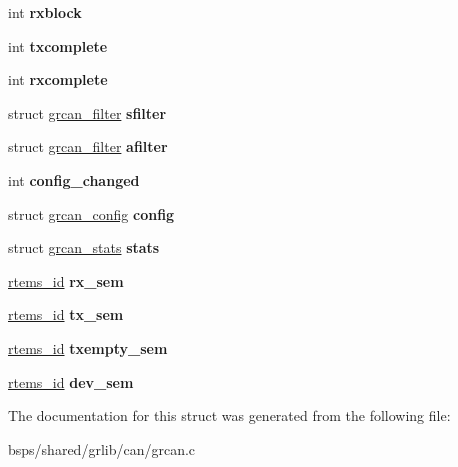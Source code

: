 \begin{DoxyCompactItemize}
int {\bfseries rxblock}
\item 
\mbox{\label{structgrcan__priv_a722037ca064180e5eb7f69c8d8c2ed09}} 
int {\bfseries txcomplete}
\item 
\mbox{\label{structgrcan__priv_a4f6cb3db3c36ff57527d652f97f72e55}} 
int {\bfseries rxcomplete}
\item 
\mbox{\label{structgrcan__priv_ac472233502e56857c0bfd4ef675fe5e2}} 
struct \mbox{\hyperlink{structgrcan__filter}{grcan\+\_\+filter}} {\bfseries sfilter}
\item 
\mbox{\label{structgrcan__priv_a7e9d2e0dddb2977432f7a9a7500bf295}} 
struct \mbox{\hyperlink{structgrcan__filter}{grcan\+\_\+filter}} {\bfseries afilter}
\item 
\mbox{\label{structgrcan__priv_a85a3bfbb21890f7a6ebaee01f8e10a02}} 
int {\bfseries config\+\_\+changed}
\item 
\mbox{\label{structgrcan__priv_ac305b34dfa9b4cf4708683691ce04a94}} 
struct \mbox{\hyperlink{structgrcan__config}{grcan\+\_\+config}} {\bfseries config}
\item 
\mbox{\label{structgrcan__priv_a73cd41fa9401c317a1634b231db22afa}} 
struct \mbox{\hyperlink{structgrcan__stats}{grcan\+\_\+stats}} {\bfseries stats}
\item 
\mbox{\label{structgrcan__priv_ae61a300a63393703fb010e3236f44fef}} 
\mbox{\hyperlink{group__ClassicTasks_gab20892b814dced7dd4e5b9bf42becd57}{rtems\+\_\+id}} {\bfseries rx\+\_\+sem}
\item 
\mbox{\label{structgrcan__priv_af06b13402fd60c91494cc55dd22234d4}} 
\mbox{\hyperlink{group__ClassicTasks_gab20892b814dced7dd4e5b9bf42becd57}{rtems\+\_\+id}} {\bfseries tx\+\_\+sem}
\item 
\mbox{\label{structgrcan__priv_a07b8c3feb7d2864eee01ccecd97b2767}} 
\mbox{\hyperlink{group__ClassicTasks_gab20892b814dced7dd4e5b9bf42becd57}{rtems\+\_\+id}} {\bfseries txempty\+\_\+sem}
\item 
\mbox{\label{structgrcan__priv_acf332e92eed35d1bf12067a46e39a1e5}} 
\mbox{\hyperlink{group__ClassicTasks_gab20892b814dced7dd4e5b9bf42becd57}{rtems\+\_\+id}} {\bfseries dev\+\_\+sem}
\end{DoxyCompactItemize}


The documentation for this struct was generated from the following file\+:\begin{DoxyCompactItemize}
\item 
bsps/shared/grlib/can/grcan.\+c\end{DoxyCompactItemize}
